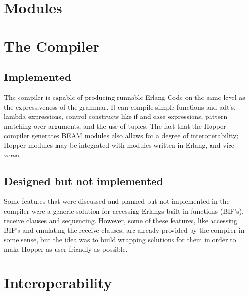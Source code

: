 \section{Modules}

\section{The Compiler}
\subsection{Implemented}
The compiler is capable of producing runnable Erlang Code on the same level as the expressiveness of the grammar. It can compile simple functions and \Acrshort{adt}'s, lambda expressions, control constructs like if and case expressions, pattern matching over arguments, and the use of tuples. The fact that the Hopper compiler generates BEAM modules also allows for a degree of interoperability; Hopper modules may be integrated with modules written in Erlang, and vice versa.


\subsection{Designed but not implemented}
Some features that were discussed and planned but not implemented in the compiler were a generic solution for accessing Erlangs built in functions (BIF's), receive clauses and sequencing. However, some of these features, like accessing BIF's and emulating the receive clauses, are already provided by the compiler in some sense, but the idea was to build wrapping solutions for them in order to make Hopper as user friendly as possible.

\section{Interoperability}